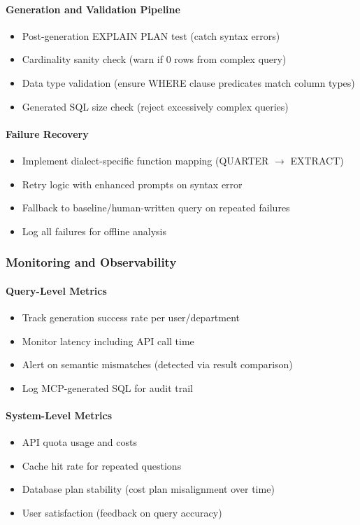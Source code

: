 \paragraph{Generation and Validation Pipeline}
\begin{itemize}
    \item Post-generation EXPLAIN PLAN test (catch syntax errors)
    \item Cardinality sanity check (warn if 0 rows from complex query)
    \item Data type validation (ensure WHERE clause predicates match column types)
    \item Generated SQL size check (reject excessively complex queries)
\end{itemize}

\paragraph{Failure Recovery}
\begin{itemize}
    \item Implement dialect-specific function mapping (QUARTER $\to$ EXTRACT)
    \item Retry logic with enhanced prompts on syntax error
    \item Fallback to baseline/human-written query on repeated failures
    \item Log all failures for offline analysis
\end{itemize}

\subsubsection{Monitoring and Observability}

\paragraph{Query-Level Metrics}
\begin{itemize}
    \item Track generation success rate per user/department
    \item Monitor latency including API call time
    \item Alert on semantic mismatches (detected via result comparison)
    \item Log MCP-generated SQL for audit trail
\end{itemize}

\paragraph{System-Level Metrics}
\begin{itemize}
    \item API quota usage and costs
    \item Cache hit rate for repeated questions
    \item Database plan stability (cost plan misalignment over time)
    \item User satisfaction (feedback on query accuracy)
\end{itemize}

